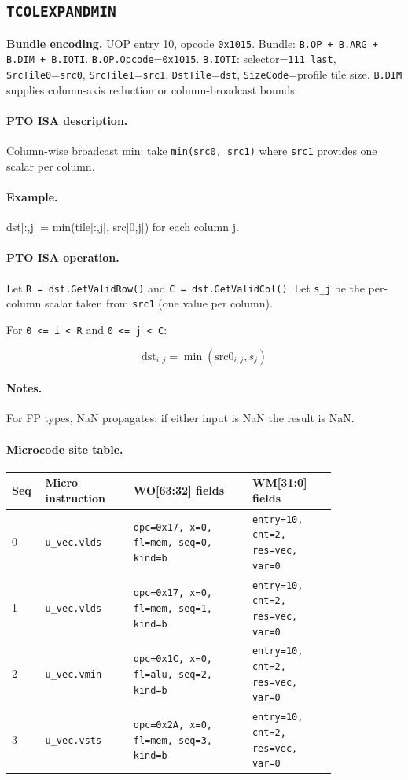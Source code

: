 \subsection{\texttt{TCOLEXPANDMIN}}
\noindent\textbf{Bundle encoding.} UOP entry 10, opcode \texttt{0x1015}. Bundle: \texttt{B.OP + B.ARG + B.DIM + B.IOTI}. \texttt{B.OP.Opcode}=\texttt{0x1015}. \texttt{B.IOTI}: selector=\texttt{111 last}, \texttt{SrcTile0}=\texttt{src0}, \texttt{SrcTile1}=\texttt{src1}, \texttt{DstTile}=\texttt{dst}, \texttt{SizeCode}=profile tile size. \texttt{B.DIM} supplies column-axis reduction or column-broadcast bounds.\par\smallskip
{\small
\paragraph{PTO ISA description.}
Column-wise broadcast min: take \texttt{min(src0, src1)} where \texttt{src1} provides one scalar per column.
\paragraph{Example.}
dst[:,j] = min(tile[:,j], src[0,j]) for each column j.
\par\smallskip
\paragraph{PTO ISA operation.}
Let \texttt{R = dst.GetValidRow()} and \texttt{C = dst.GetValidCol()}. Let \texttt{s\_j} be the per-column scalar taken from \texttt{src1} (one value per column).

For \texttt{0 \textless{}= i \textless{} R} and \texttt{0 \textless{}= j \textless{} C}:

\[
\mathrm{dst}_{i,j} = \min(\mathrm{src0}_{i,j}, s_j)
\]
}\par\smallskip
\paragraph{Notes.}
For FP types, NaN propagates: if either input is NaN the result is NaN.
\paragraph{Microcode site table.}
{\scriptsize
\begin{longtable}{@{}R{0.055\linewidth}L{0.23\linewidth}L{0.31\linewidth}L{0.22\linewidth}@{}}
\toprule
Seq & Micro instruction & WO[63:32] fields & WM[31:0] fields \\
 & \texttt{u\_vec.vlds} & \texttt{opc=0x17, x=0, fl=mem, seq=0, kind=b} & \texttt{entry=10, cnt=2, res=vec, var=0} \\
1 & \texttt{u\_vec.vlds} & \texttt{opc=0x17, x=0, fl=mem, seq=1, kind=b} & \texttt{entry=10, cnt=2, res=vec, var=0} \\
2 & \texttt{u\_vec.vmin} & \texttt{opc=0x1C, x=0, fl=alu, seq=2, kind=b} & \texttt{entry=10, cnt=2, res=vec, var=0} \\
3 & \texttt{u\_vec.vsts} & \texttt{opc=0x2A, x=0, fl=mem, seq=3, kind=b} & \texttt{entry=10, cnt=2, res=vec, var=0} \\
\bottomrule
\end{longtable}
}
